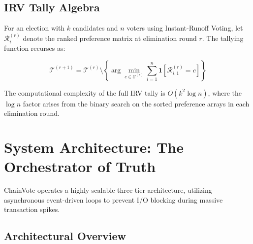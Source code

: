 \documentclass[journal,10pt,twocolumn]{IEEEtran}
\begin{document}
\subsection{IRV Tally Algebra}

For an election with $k$ candidates and $n$ voters using Instant-Runoff Voting, let $\mathcal{R}_{i}^{(r)}$ denote the ranked preference matrix at elimination round $r$. The tallying function recurses as:

\begin{equation}
    \mathcal{T}^{(r+1)} = \mathcal{T}^{(r)} \setminus \left\{ \arg\min_{c \in \mathcal{C}^{(r)}} \sum_{i=1}^{n} \mathbf{1}\!\left[\mathcal{R}_{i,1}^{(r)} = c\right] \right\}
\end{equation}

The computational complexity of the full IRV tally is $O(k^2 \log n)$, where the $\log n$ factor arises from the binary search on the sorted preference arrays in each elimination round.

\section{System Architecture: The Orchestrator of Truth}

ChainVote operates a highly scalable three-tier architecture, utilizing asynchronous event-driven loops to prevent I/O blocking during massive transaction spikes.

\subsection{Architectural Overview}
\end{document}
